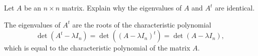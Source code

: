 \documentclass{ximera}
\author{Marty Golubitsky}
\begin{document}

\begin{exercise}\label{c10.2.6B}

Let $A$ be an $n\times n$ matrix.  Explain why the eigenvalues of $A$ and $A^t$ are identical.
  
\begin{solution}

\soln The eigenvalues of $A^t$ are the roots of the characteristic polynomial 
\[
\det(A^t - \lambda I_n) = \det((A-\lambda I_n)^t) = \det(A-\lambda I_n),
\]
which is equal to the characteristic polynomial of the matrix $A$.

\end{solution}
\end{exercise}
\end{document}

